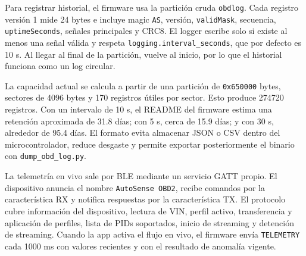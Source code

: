 \documentclass[12pt,letterpaper]{report}
\begin{document}
Para registrar historial, el firmware usa la partición cruda \texttt{obdlog}. Cada registro versión 1 mide 24 bytes e incluye magic \texttt{AS}, versión, \texttt{validMask}, secuencia, \texttt{uptimeSeconds}, señales principales y CRC8. El logger escribe solo si existe al menos una señal válida y respeta \texttt{logging.interval\_seconds}, que por defecto es 10 s. Al llegar al final de la partición, vuelve al inicio, por lo que el historial funciona como un log circular.

La capacidad actual se calcula a partir de una partición de \texttt{0x650000} bytes, sectores de 4096 bytes y 170 registros útiles por sector. Esto produce 274720 registros. Con un intervalo de 10 s, el README del firmware estima una retención aproximada de 31.8 días; con 5 s, cerca de 15.9 días; y con 30 s, alrededor de 95.4 días. El formato evita almacenar JSON o CSV dentro del microcontrolador, reduce desgaste y permite exportar posteriormente el binario con \texttt{dump\_obd\_log.py}.

La telemetría en vivo sale por BLE mediante un servicio GATT propio. El dispositivo anuncia el nombre \texttt{AutoSense OBD2}, recibe comandos por la característica RX y notifica respuestas por la característica TX. El protocolo cubre información del dispositivo, lectura de VIN, perfil activo, transferencia y aplicación de perfiles, lista de PIDs soportados, inicio de streaming y detención de streaming. Cuando la app activa el flujo en vivo, el firmware envía \texttt{TELEMETRY} cada 1000 ms con valores recientes y con el resultado de anomalía vigente.
\end{document}
